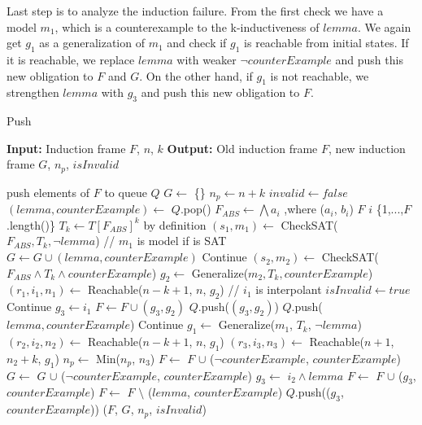 Last step is to analyze the induction failure. From the first check we have a model $m_1$, which is a counterexample to the k-inductiveness of $lemma$. We again get $g_1$ as a generalization of $m_1$ and check if $g_1$ is reachable from initial states. If it is reachable, we replace $lemma$ with weaker $\neg counterExample$ and push this new obligation to $F$ and $G$. On the other hand, if $g_1$ is not reachable, we strengthen $lemma$ with $g_3$ and push this new obligation to $F$.

\begin{algorithm}
    \caption{Push}\label{alg:3}
\begin{algorithmic}[1]
\State \textbf{Input:} Induction frame $F$, $n$, $k$
\State \textbf{Output:} Old induction frame $F$, new induction frame $G$, $n_p$, $isInvalid$ 

\State push elements of $F$ to queue $Q$
    \State $G \gets$ \{\}
    \State $n_p \gets n + k$
    \State $invalid \gets false$
        \State $(lemma, counterExample)  \gets$ $Q$.pop()
        \State $F_{ABS} \gets \bigwedge a_i$ ,where ($a_i$, $b_i$) \in $F$ \forall $i$ \in \{1,...,$F$.length()\}
        \State $T_k \gets T[F_{ABS}]^k$ by definition
        \State $(s_1, m_1) \gets$ CheckSAT($F_{ABS}, T_k, \neg lemma$) // $m_1$ is model if is SAT
            \State $G \gets G \cup (lemma, counterExample)$
            \State Continue
        \EndIf
        \State $(s_2, m_2) \gets$ CheckSAT($F_{ABS} \wedge T_k \wedge counterExample$)
            \State $ g_2 \gets $ Generalize($m_2, T_k, counterExample$)
            \State $(r_1, i_1, n_1) \gets $ Reachable($n-k+1$, $n$, $g_2$) // $i_1$ is interpolant
                \State $ isInvalid \gets true $
                \State Continue
            \Else
                \State $g_3 \gets i_1$
                \State $F \gets F \cup (g_3, g_2)$
                \State $Q$.push($(g_3, g_2)$)
                \State $Q$.push($lemma, counterExample$)
                \State Continue
            \EndIf
        \EndIf
        \State $g_1 \gets$ Generalize($m_1$, $T_k$, $\neg lemma$)
        \State $(r_2, i_2, n_2) \gets $ Reachable($n-k+1$, $n$, $g_1$)
            \State $(r_3, i_3, n_3) \gets $ Reachable($n+1$, $n_2 + k$, $g_1$)
            \State $n_p \gets $ Min($n_p$, $n_3$)
            \State $F \gets$ $F$ $\cup $ ($\neg counterExample$, $counterExample$)
            \State $G \gets$ $G$ $\cup $ ($\neg counterExample$, $counterExample$)
        \Else
            \State $g_3 \gets$ $i_2 \wedge lemma$
            \State $F \gets$ $F$ $\cup $ ($g_3$, $counterExample$)
            \State $F \gets$ $F$ $\setminus $ ($lemma$, $counterExample$)
            \State $Q$.push(($g_3$, $counterExample$))
        \EndIf
        \State \Return ($F$, $G$, $n_p$, $isInvalid$)
    \EndWhile
        
\end{algorithmic}
\end{algorithm}


